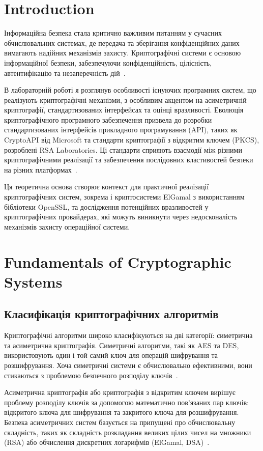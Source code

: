 \section{Introduction}

Інформаційна безпека стала критично важливим питанням у сучасних обчислювальних системах, де передача та зберігання
конфіденційних даних вимагають надійних механізмів захисту. Криптографічні системи є основою інформаційної безпеки,
забезпечуючи конфіденційність, цілісність, автентифікацію та незаперечність дій~\cite{stallings2017}.

В лабораторній роботі я розглянув особливості існуючих програмних систем, що реалізують криптографічні механізми,
з особливим акцентом на асиметричній криптографії, стандартизованих інтерфейсах та оцінці вразливості. Еволюція
криптографічного програмного забезпечення призвела до розробки стандартизованих інтерфейсів прикладного програмування
(API), таких як CryptoAPI від Microsoft та стандарти криптографії з відкритим ключем (PKCS), розроблені RSA Laboratories.
Ці стандарти сприяють взаємодії між різними криптографічними реалізації та забезпечення послідовних властивостей безпеки
на різних платформах~\cite{pkcs1,cryptoapi}.

Ця теоретична основа створює контекст для практичної реалізації криптографічних систем, зокрема і криптосистеми ElGamal
з використанням бібліотеки OpenSSL, та дослідження потенційних вразливостей у криптографічних провайдерах, які можуть
виникнути через недосконалість механізмів захисту операційної системи.

\section{Fundamentals of Cryptographic Systems}

\subsection{Класифікація криптографічних алгоритмів}

Криптографічні алгоритми широко класифікуються на дві категорії: симетрична та асиметрична криптографія. Симетричні
алгоритми, такі як AES та DES, використовують один і той самий ключ для операцій шифрування та розшифрування. Хоча
симетричні системи є обчислювально ефективними, вони стикаються з проблемою безпечного розподілу ключів~\cite{ferguson2010}.

Асиметрична криптографія або криптографія з відкритим ключем вирішує проблему розподілу ключів за допомогою математично
пов'язаних пар ключів: відкритого ключа для шифрування та закритого ключа для розшифрування. Безпека асиметричних систем
базується на припущені про обчислювальну складність, таких як складність розкладання великих цілих чисел на множники
(RSA) або обчислення дискретних логарифмів (ElGamal, DSA)~\cite{menezes1996}.

